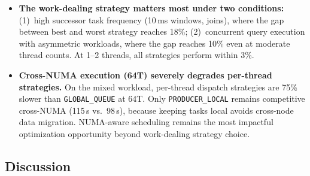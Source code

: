 \begin{itemize}
    \item \textbf{The work-dealing strategy matters most under two conditions:}
    (1)~high successor task frequency (10\,ms windows, joins), where the gap between best and worst strategy reaches 18\%;
    (2)~concurrent query execution with asymmetric workloads, where the gap reaches 10\% even at moderate thread counts.
    At 1--2 threads, all strategies perform within 3\%.

    \item \textbf{Cross-NUMA execution (64T) severely degrades per-thread strategies.}
    On the mixed workload, per-thread dispatch strategies are 75\% slower than \texttt{GLOBAL\_QUEUE} at 64T.
    Only \texttt{PRODUCER\_LOCAL} remains competitive cross-NUMA (115\,s vs.\ 98\,s), because keeping tasks local avoids cross-node data migration.
    NUMA-aware scheduling remains the most impactful optimization opportunity beyond work-dealing strategy choice.
\end{itemize}


\subsection{Discussion}





